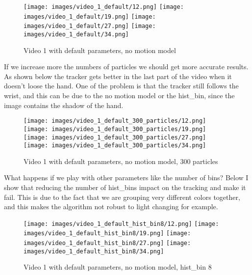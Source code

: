 \documentclass{ETHExercise}
\begin{document}
\begin{figure}[!h]
    \texttt{[image: images/video\_1\_default/12.png]}
  \endminipage
    \texttt{[image: images/video\_1\_default/19.png]}
  \endminipage
    \texttt{[image: images/video\_1\_default/27.png]}
  \endminipage\space
    \texttt{[image: images/video\_1\_default/34.png]}
  \endminipage
  \caption{Video 1 with default parameters, no motion model}
\end{figure}

If we increase more the numbers of particles we should get more 
accurate results. As shown below the tracker gets better in the last part
of the video when it doesn't loose the hand. One of the problem is 
that the tracker still follows the wrist, and this can be due to the no motion
model or the hist\_bin, since the image contains the shadow of the hand. 

\begin{figure}[!h]
    \texttt{[image: images/video\_1\_default\_300\_particles/12.png]}
  \endminipage
    \texttt{[image: images/video\_1\_default\_300\_particles/19.png]}
  \endminipage
    \texttt{[image: images/video\_1\_default\_300\_particles/27.png]}
  \endminipage\space
    \texttt{[image: images/video\_1\_default\_300\_particles/34.png]}
  \endminipage
  \caption{Video 1 with default parameters, no motion model, 300 particles}
\end{figure}

\newpage
What happens if we play with other parameters like the number
of bins? Below I show that reducing the number of hist\_bins impact
on the tracking and make it fail. This is due to the fact that we are 
grouping very different colors together, and this makes the algorithm 
not robust to light changing for example.

\begin{figure}[!h]
    \texttt{[image: images/video\_1\_default\_hist\_bin8/12.png]}
  \endminipage
    \texttt{[image: images/video\_1\_default\_hist\_bin8/19.png]}
  \endminipage
    \texttt{[image: images/video\_1\_default\_hist\_bin8/27.png]}
  \endminipage\space
    \texttt{[image: images/video\_1\_default\_hist\_bin8/34.png]}
  \endminipage
  \caption{Video 1 with default parameters, no motion model, hist\_bin 8}
\end{figure}
\end{document}
